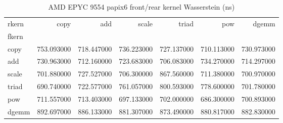 \begin{table}
\caption{AMD EPYC 9554 papix6 front/rear kernel Wasserstein (ns)}
\begin{tabular}{lrrrrrr}
\toprule
rkern & copy & add & scale & triad & pow & dgemm \\
fkern &  &  &  &  &  &  \\
\midrule
copy & 753.093000 & 718.447000 & 736.223000 & 727.137000 & 710.113000 & 730.973000 \\
add & 730.963000 & 712.160000 & 723.683000 & 706.083000 & 734.270000 & 714.297000 \\
scale & 701.880000 & 727.527000 & 706.300000 & 867.560000 & 711.380000 & 700.970000 \\
triad & 690.740000 & 722.577000 & 761.057000 & 800.593000 & 778.600000 & 701.780000 \\
pow & 711.557000 & 713.403000 & 697.133000 & 702.000000 & 686.300000 & 700.893000 \\
dgemm & 892.697000 & 886.133000 & 881.307000 & 873.490000 & 880.817000 & 882.830000 \\
\bottomrule
\end{tabular}
\end{table}
